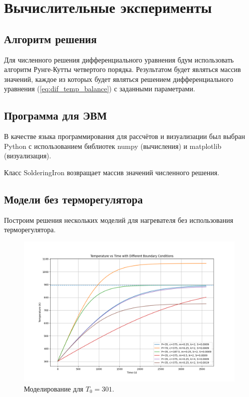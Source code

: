 \chapter{Вычислительные эксперименты}
\section{Алгоритм решения}

Для численного решения дифференциального уравнения бдум использовать алгоритм Рунге-Кутты четвертого порядка. Результатом будет являться массив значений, каждое из которых будет являться решением дифференциального уравнения (\ref{eq:dif_temp_balance}) с заданными параметрами.

\section{Программа для ЭВМ}

В качестве языка программирования для рассчётов и визуализации был выбран Python с использованием библиотек numpy (вычисления) и matplotlib (визуализация).

 

Класс SolderingIron возвращает массив значений численного решения.

\newpage
\section{Модели без терморегулятора}

Построим решения нескольких моделий для нагревателя без использования терморегулятора.

\begin{figure}[h]  %
	\centering
	\includegraphics[width=1\textwidth]{imgs/heater_w.o_controll.png}  %
	\caption{Моделирование для $T_0 = 301$.}  %
	\label{fig:heater_without_controll}  %
\end{figure}

